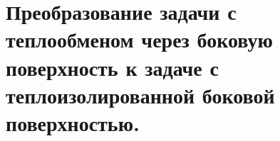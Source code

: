 \section{Преобразование задачи с теплообменом через боковую поверхность к задаче
с теплоизолированной боковой поверхностью.}

\newpage
